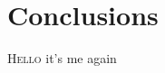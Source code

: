 \section[Conclusions]
{Conclusions}


\lettrine[lines=2, findent=3pt, nindent=0pt]{H}{ello} it's me again
